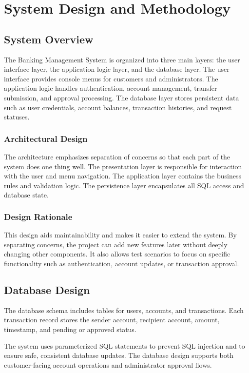 \documentclass[12pt,a4paper]{report}
\begin{document}
\chapter{System Design and Methodology}
\section{System Overview}
The Banking Management System is organized into three main layers: the user interface layer, the application logic layer, and the database layer. The user interface provides console menus for customers and administrators. The application logic handles authentication, account management, transfer submission, and approval processing. The database layer stores persistent data such as user credentials, account balances, transaction histories, and request statuses.

\subsection{Architectural Design}
The architecture emphasizes separation of concerns so that each part of the system does one thing well. The presentation layer is responsible for interaction with the user and menu navigation. The application layer contains the business rules and validation logic. The persistence layer encapsulates all SQL access and database state.

\subsection{Design Rationale}
This design aids maintainability and makes it easier to extend the system. By separating concerns, the project can add new features later without deeply changing other components. It also allows test scenarios to focus on specific functionality such as authentication, account updates, or transaction approval.

\section{Database Design}
The database schema includes tables for users, accounts, and transactions. Each transaction record stores the sender account, recipient account, amount, timestamp, and pending or approved status.

The system uses parameterized SQL statements to prevent SQL injection and to ensure safe, consistent database updates. The database design supports both customer-facing account operations and administrator approval flows.
\end{document}
